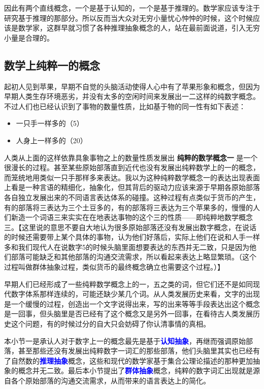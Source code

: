 \documentclass[12pt,oneside]{book}
\renewcommand{\emph}[1]{\textcolor{blue}{\textbf{#1}}}
\begin{document}
因此有两个直线概念，一个是基于认知的，一个是基于推理的。数学家应该专注于研究基于推理的那部分。所以反而当大众对无穷小量忧心忡忡的时候，这个时候应该是数学家，这群早就习惯了各种推理抽象概念的人，站在最前面说道，引入无穷小量是合理的。


\subsection{数学上纯粹一的概念}
起初人见到苹果，早期不自觉的头脑活动使得人心中有了苹果形象和概念，但因为早期人类生存环境恶劣，并没有太多的空闲时间来发展出一二这样的纯数字概念。不过人们也已经认识到了事物的数量性质，比如基于物的同一性有如下表述：

\begin{itemize}
\item 一只手一样多的（5）
\item 人身上一样多的（20）
\end{itemize}

人类从上面的这样依靠具象事物之上的数量性质发展出 \textbf{纯粹的数学概念一} 是一个很漫长的过程。甚至某些原始部落直到近代也没有发展出纯粹数学上的一的概念，而笼统地用类似一只手那样多来表达。我以为这种纯粹数学概念一的表达出现表面上看是一种言语的精细化，抽象化，但其背后的驱动力应该来源于早期各原始部落各自独立发展出来的不同语言表达体系的碰撞。这种过程有点类似于货币的产生，有的部落将三表达为三个土豆多的，有的部落将三表达为三个苹果多的，慢慢的人们新造一个词语三来实实在在地表达事物的这个三的性质——即纯粹地数学概念三。【这里说的意思不要自大地认为很多原始部落还没有发展出数字概念，在说话的时候还需要带上某个具体的事物，认为他们好落后，实际上他们在说和人手一样多和我们现代人在说数字5的时候头脑里面想要表达的东西并无二致，只是因为他们部落可能缺乏和其他部落的沟通交流需求，所以看起来表达上略显繁琐。（这个过程叫做群体抽象过程，类似货币的最终概念确立也需要这个过程。）】

早期人们已经形成了一些纯粹数学概念上的一，五之类的词，但它们还不是如同现代数字体系那样连续的，可能还缺少某几个词。从人类发展历史来看，文字的出现是一个缓慢的过程，创造出一个文字说得出来，写的出来等等手段表达出这个概念是一回事，但头脑里是否已经有了这个概念又是另外一回事，在看待古人类发展历史这个问题，有的时候过分的自大只会妨碍了你认清事情的真相。

本小节一是承认人对于数字上一的概念最先是基于\emph{认知抽象}，再继而强调原始部落，甚至那些还没有发展出纯粹数字一词汇的那些部落，他们头脑里其实也已经有了自然数的\emph{推理抽象}概念，这些和现代的数学家基于集合公理论描述的那种更加抽象的概念并无二致。最后本小节提出了\emph{群体抽象}概念，纯粹的数字词汇出现就是源自各个原始部落的沟通交流需求，从而带来的语言表达上的简化。
\end{document}

